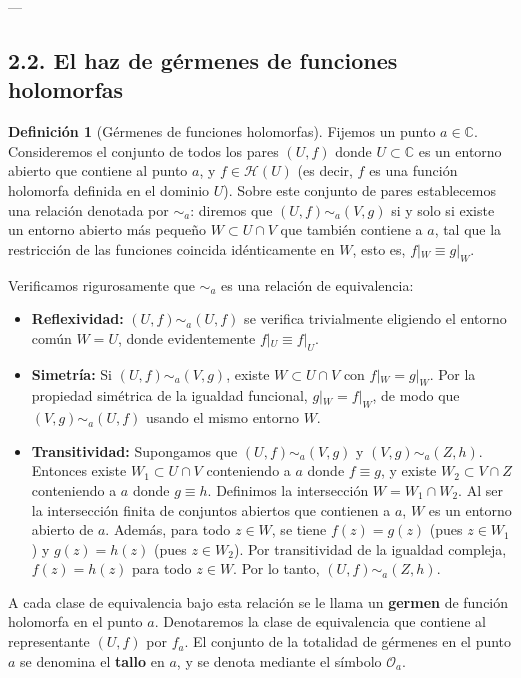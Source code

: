 \documentclass[11pt,a4paper]{article}
\theoremstyle{definition}
\newtheorem{definicion}{Definición}[section]
\theoremstyle{remark}
\numberwithin{equation}{section}
\begin{document}
---

\subsection{2.2. El haz de gérmenes de funciones holomorfas}

\begin{definicion}[Gérmenes de funciones holomorfas]
Fijemos un punto $a \in \mathbb{C}$. Consideremos el conjunto de todos los pares $(U, f)$ donde $U \subset \mathbb{C}$ es un entorno abierto que contiene al punto $a$, y $f \in \mathcal{H}(U)$ (es decir, $f$ es una función holomorfa definida en el dominio $U$).
Sobre este conjunto de pares establecemos una relación denotada por $\sim_a$: diremos que $(U, f) \sim_a (V, g)$ si y solo si existe un entorno abierto más pequeño $W \subset U \cap V$ que también contiene a $a$, tal que la restricción de las funciones coincida idénticamente en $W$, esto es, $f|_W \equiv g|_W$.

Verificamos rigurosamente que $\sim_a$ es una relación de equivalencia:
\begin{itemize}
    \item \textbf{Reflexividad:} $(U, f) \sim_a (U, f)$ se verifica trivialmente eligiendo el entorno común $W = U$, donde evidentemente $f|_U \equiv f|_U$.
    \item \textbf{Simetría:} Si $(U, f) \sim_a (V, g)$, existe $W \subset U \cap V$ con $f|_W = g|_W$. Por la propiedad simétrica de la igualdad funcional, $g|_W = f|_W$, de modo que $(V, g) \sim_a (U, f)$ usando el mismo entorno $W$.
    \item \textbf{Transitividad:} Supongamos que $(U, f) \sim_a (V, g)$ y $(V, g) \sim_a (Z, h)$. Entonces existe $W_1 \subset U \cap V$ conteniendo a $a$ donde $f \equiv g$, y existe $W_2 \subset V \cap Z$ conteniendo a $a$ donde $g \equiv h$. Definimos la intersección $W = W_1 \cap W_2$. Al ser la intersección finita de conjuntos abiertos que contienen a $a$, $W$ es un entorno abierto de $a$. Además, para todo $z \in W$, se tiene $f(z) = g(z)$ (pues $z \in W_1$) y $g(z) = h(z)$ (pues $z \in W_2$). Por transitividad de la igualdad compleja, $f(z) = h(z)$ para todo $z \in W$. Por lo tanto, $(U, f) \sim_a (Z, h)$.
\end{itemize}

A cada clase de equivalencia bajo esta relación se le llama un \textbf{germen} de función holomorfa en el punto $a$. Denotaremos la clase de equivalencia que contiene al representante $(U, f)$ por $f_a$.
El conjunto de la totalidad de gérmenes en el punto $a$ se denomina el \textbf{tallo} en $a$, y se denota mediante el símbolo $\mathcal{O}_a$.


\end{definicion}
\end{document}
